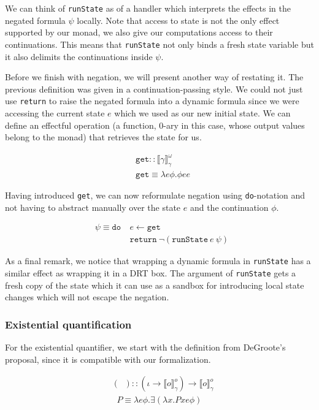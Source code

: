 \documentclass{article}
\newcommand{\dnot}{\mathop{\bar{\lnot}}}
\newcommand{\dexists}{\mathop{\bar{\exists}}}
\newcommand{\statecps}[3]{\llbracket #3 \rrbracket^{#2}_{#1}}
\begin{document}
We can think of \texttt{runState} as of a handler which interprets the effects
in the negated formula $\psi$ locally. Note that access to state is not the
only effect supported by our monad, we also give our computations access to
their continuations. This means that \texttt{runState} not only binds a fresh
state variable but it also delimits the continuations inside $\psi$.

Before we finish with negation, we will present another way of restating
it. The previous definition was given in a continuation-passing style. We
could not just use \texttt{return} to raise the negated formula into a dynamic
formula since we were accessing the current state $e$ which we used as our new
initial state. We can define an effectful operation (a function, 0-ary in this
case, whose output values belong to the monad) that retrieves the state for
us.

\begin{align*}
& \texttt{get} :: \statecps{\gamma}{\omega}{\gamma} \\
& \texttt{get} \equiv \lambda e \phi. \phi e e
\end{align*}

Having introduced \texttt{get}, we can now reformulate negation using
\texttt{do}-notation and not having to abstract manually over the state $e$
and the continuation $\phi$.

\begin{align*}
\dnot \psi \equiv \texttt{do}\ & e \gets \texttt{get} \\
                               & \texttt{return}\ \lnot (\texttt{runState}\ e\ \psi)
\end{align*}

As a final remark, we notice that wrapping a dynamic formula in
\texttt{runState} has a similar effect as wrapping it in a DRT box. The
argument of \texttt{runState} gets a fresh copy of the state which it can use
as a sandbox for introducing local state changes which will not escape the
negation.


\subsubsection{Existential quantification}

For the existential quantifier, we start with the definition from DeGroote's
proposal, since it is compatible with our formalization.

\begin{align*}
& (\dexists) :: (\iota \to \statecps{\gamma}{o}{o}) \to \statecps{\gamma}{o}{o} \\
& \dexists P \equiv \lambda e \phi. \exists (\lambda x. P x e \phi)
\end{align*}
\end{document}
